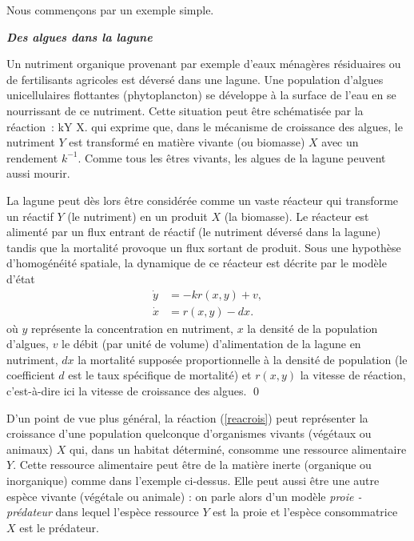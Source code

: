 Nous commençons par un exemple simple.

\begin{exemple}{\bf \em Des algues dans la lagune}

Un nutriment organique provenant par exemple d'eaux ménagères
résiduaires ou de fertilisants agricoles est déversé dans une lagune. Une
population d'algues unicellulaires flottantes (phytoplancton) se développe
à la surface de l'eau en se nourrissant de ce nutriment. Cette situation peut
être schématisée par la réaction~:
\eqn
kY \longrightarrow X. \label{reacrois}
\eeqn
qui exprime que, dans le mécanisme de croissance des algues, le nutriment
$Y$ est transformé en matière vivante (ou biomasse) $X$ avec un
rendement $k^{-1}$. Comme tous les êtres vivants, les algues de la lagune
peuvent aussi mourir.

La lagune peut dès lors être considérée comme un vaste réacteur qui
transforme un réactif $Y$ (le nutriment) en un produit $X$ (la
biomasse). Le réacteur est alimenté par un flux entrant de réactif (le
nutriment déversé dans la lagune) tandis que la mortalité provoque un flux
sortant de produit. Sous une hypothèse
d'homogénéité spatiale, la dynamique de ce réacteur est décrite par
le modèle d'état
\begin{equation} \begin{split} \label{lagune}
\dot y &= -kr(x,y) + v, \\
\dot x &= r(x,y) - dx.
\end{split} \end{equation}
où $y$ représente la concentration en nutriment, $x$ la densité de la
population d'algues, $v$ le débit (par unité de volume) d'alimentation de la
lagune en nutriment, $dx$ la mortalité supposée proportionnelle à la
densité de population (le coefficient $d$ est le taux spécifique de
mortalité) et $r(x,y)$ la vitesse de réaction, c'est-à-dire ici la vitesse
de croissance des algues. \qed
\end{exemple}
D'un point de vue plus général, la réaction (\ref{reacrois}) peut
représenter la croissance d'une population quelconque d'organismes vivants
(végétaux ou animaux) $X$ qui, dans un habitat déterminé, consomme
une ressource alimentaire $Y$. Cette ressource alimentaire peut être de
la matière inerte (organique ou inorganique) comme dans l'exemple
ci-dessus. Elle peut aussi être une autre espèce vivante (végétale ou animale) : on parle
alors d'un modèle {\em proie - prédateur} dans lequel l'espèce ressource
$Y$ est la proie et l'espèce consommatrice $X$ est le prédateur.
